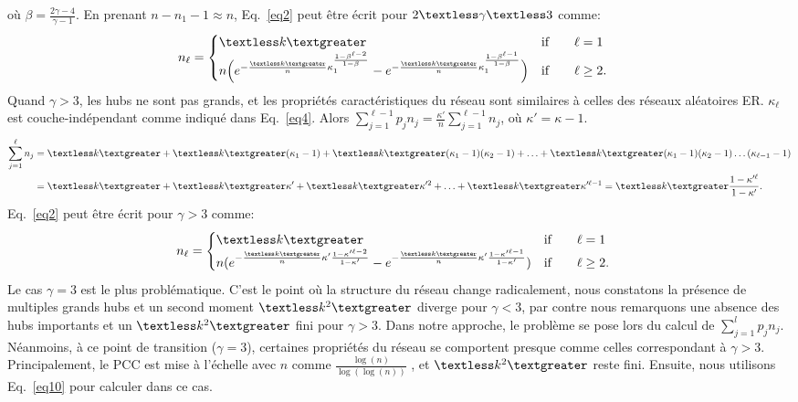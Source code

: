 où $\beta=\frac{2\gamma-4}{\gamma-1}$. En prenant $n-n_1-1 \approx n$, Eq.~\eqref{eq2} peut être écrit pour $2\textless \gamma \textless 3$ comme:
\begin{align}
n_{\ell} &=
\begin{cases}
\km & \text{if}\qquad \ell=1 \\
n\Big(e^{-\frac{\km}{n}\kappa_1^{\frac{1-\beta^{\ell-2}}{1-\beta}}}-e^{-\frac{\km}{n}\kappa_1^{\frac{1-\beta^{\ell-1}}{1-\beta}}}\Big) & \text{if}\qquad \ell \ge 2.
\end{cases}
\label{eq8}
\end{align}
Quand $\gamma> 3 $, les hubs ne sont pas grands, et les propriétés caractéristiques du réseau sont similaires à celles des réseaux aléatoires ER.
 $\kappa_{\ell}$ est couche-indépendant comme indiqué dans Eq.~\eqref{eq4}.
Alors $\sum_{j=1}^{\ell-1}p_j n_j=\frac{\kappa'}{n}\sum_{j=1}^{\ell-1}n_j$, où $\kappa'=\kappa-1$.  
\begin{align}
\sum_{j=1}^{\ell}n_j &=\km+\km(\kappa_1-1)+\km(\kappa_1-1)(\kappa_2-1)+\ldots+\km(\kappa_1-1)(\kappa_2-1)\ldots(\kappa_{\ell-1}-1) \nonumber\\
&=\km+\km\kappa'+\km\kappa'^2+\ldots+\km\kappa'^{\ell-1}=\km\frac{1-\kappa'^{\ell}}{1-\kappa'}. 
\label{eq9}
\end{align}
Eq.~\eqref{eq2} peut être écrit pour $\gamma>3$ comme:
\begin{align}
n_{\ell} &=
\begin{cases}
\textless k \textgreater & \text{if}\qquad \ell=1 \\
n(e^{-\frac{\textless k \textgreater}{n}\kappa'\frac{1-\kappa'^{\ell-2}}{1-\kappa'}}-e^{-\frac{\km}{n}\kappa'\frac{1-\kappa'^{\ell-1}}{1-\kappa'}}) & \text{if}\qquad \ell \ge 2.
\end{cases}
\label{eq10}
\end{align}
Le cas $\gamma=3$ est le plus problématique. C'est le point où la structure du réseau change radicalement, nous constatons la présence de multiples grands hubs et un second moment  $\textless k^2 \textgreater$ diverge pour $\gamma<3$, par contre nous remarquons une absence des hubs importants et un $\textless k^2  \textgreater$ fini pour $\gamma>3$.
Dans notre approche, le problème se pose lors du calcul de $\sum_{j=1}^{l}p_jn_j$. Néanmoins, à ce point de transition ($\gamma=3$), certaines propriétés du réseau se comportent presque comme celles correspondant à $\gamma>3$.
Principalement, le PCC est mise à l'échelle avec $n$ comme $\frac {\log(n)}{\log(\log(n))}$ \cite{Bollobas-Riordan2004}, et $\textless k^2  \textgreater$ reste fini. Ensuite, nous utilisons Eq.~\eqref{eq10} pour calculer \nl dans ce cas. \\
